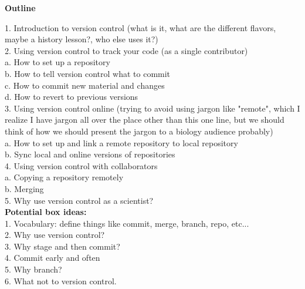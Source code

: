 \textbf{Outline}

1. Introduction to version control (what is it, what are the different flavors, maybe a history lesson?, who else uses it?)\\

2. Using version control to track your code (as a single contributor)\\
    a. How to set up a repository\\
    b. How to tell version control what to commit\\
    c. How to commit new material and changes\\
    d. How to revert to previous versions\\
    
3. Using version control online (trying to avoid using jargon like "remote", which I realize I have jargon all over the place other than this one line, but we should think of how we should present the jargon to a biology audience probably)\\
    a. How to set up and link a remote repository to local repository\\
    b. Sync local and online versions of repositories\\
    
4. Using version control with collaborators\\
    a. Copying a repository remotely\\
    b. Merging\\
    
5. Why use version control as a scientist?\\


\textbf{Potential box ideas:}\\
1. Vocabulary: define things like commit, merge, branch, repo, etc...\\
2. Why use version control?\\
3. Why stage and then commit?\\
4. Commit early and often\\
5. Why branch?\\
6. What not to version control.\\